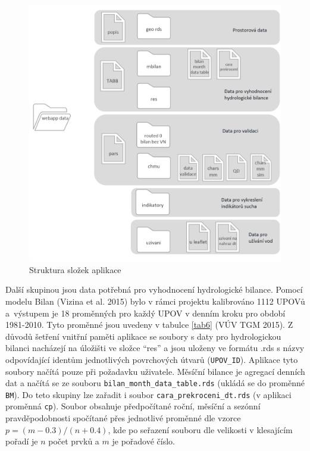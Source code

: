 \documentclass[12pt,]{article}
\begin{document}
\begin{figure}[H]
      \includegraphics[width=\textwidth]{fig/struktura2}
      \caption{Struktura složek aplikace}
      \label{fig:ch5.1}
\end{figure}

\qquad Další skupinou jsou data potřebná pro vyhodnocení hydrologické
bilance. Pomocí modelu Bilan (Vizina et al. 2015) bylo v rámci projektu
kalibrováno 1112 UPOVů a~výstupem je 18 proměnných pro každý UPOV v
denním kroku pro období \mbox{1981-2010}. Tyto proměnné jsou uvedeny v
tabulce \ref{tab6} (VÚV TGM 2015). Z důvodů šetření vnitřní paměti
aplikace se soubory s daty pro hydrologickou bilanci nacházejí na
úložišti ve složce \enquote{res} a jsou uloženy ve formátu .rds s názvy
odpovídající identům jednotlivých povrchových útvarů
(\texttt{UPOV\_ID}). Aplikace tyto soubory načítá pouze při požadavku
uživatele. Měsíční bilance je agregací denních dat a načítá se ze
souboru \texttt{bilan\_month\_data\_table.rds} (ukládá se do proměnné
\texttt{BM}). Do teto skupiny lze zařadit i soubor
\texttt{cara\_prekroceni\_dt.rds} (v aplikaci proměnná \texttt{cp}).
Soubor obsahuje předpočítané roční, měsíční a sezónní pravděpodobnosti
spočítané přes jednotlivé proměnné dle vzorce \(p = (m-0.3)/(n+0.4)\),
kde po seřazení souboru dle velikosti v klesajícím pořadí je \(n\) počet
prvků a \(m\) je pořadové číslo.
\end{document}
